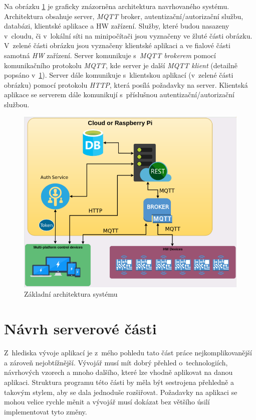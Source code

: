 Na obrázku \ref{figure:architektura} je graficky znázorněna architektura navrhovaného systému.
Architektura obsahuje server, \emph{MQTT} broker, autentizační/autorizační službu, databázi, klientské aplikace a HW zařízení.
Služby, které budou nasazeny v~cloudu, či v~lokální síti na minipočítači jsou vyznačeny ve žluté části obrázku.
V~zelené části obrázku jsou vyznačeny klientské aplikaci a ve fialové části samotná \emph{HW} zařízení.
Server komunikuje s~\emph{MQTT brokerem} pomocí komunikačního protokolu \emph{MQTT}, kde server je další \emph{MQTT klient} (detailně popsáno v~\ref{navrh:backend}).
Server dále komunikuje s~klientskou aplikací (v~zelené části obrázku) pomocí protokolu \emph{HTTP}, která posílá požadavky na server.
Klientská aplikace se serverem dále komunikují s~příslušnou autentizační/autorizační službou.

\begin{figure}[hbt]
  \centering
  \includegraphics[width=0.8 \linewidth]{obrazky-figures/navrh.png}
  \caption{Základní architektura systému}
  \label{figure:architektura}
\end{figure}

\section{Návrh serverové části}
\label{navrh:backend}
Z~hlediska vývoje aplikací je z~mého pohledu tato část práce nejkomplikovanější a zároveň nejobtížnější.
Vývojář musí mít dobrý přehled o~technologiích, návrhových vzorech a mnoho dalšího, které lze vhodně aplikovat na danou aplikaci.
Struktura programu této části by měla být sestrojena přehledně a takovým stylem, aby se dala jednoduše rozšiřovat.
Požadavky na aplikaci se mohou velice rychle měnit a vývojář musí dokázat bez většího úsilí implementovat tyto změny.

